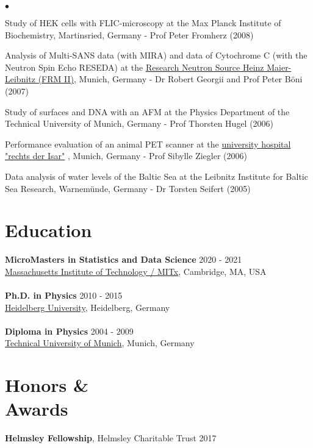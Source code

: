 \documentclass[margin,line]{res}
\newenvironment{list2}{
  \begin{list}{$\bullet$}{%
      \setlength{\itemsep}{0in}
      \setlength{\parsep}{0in} \setlength{\parskip}{0in}
      \setlength{\topsep}{0in} \setlength{\partopsep}{0in} 
      \setlength{\leftmargin}{0.2in}}}{\end{list}}
\begin{document}
\begin{resume}
\begin{list2}
\item Study of HEK cells with FLIC-microscopy at the Max Planck Institute of Biochemistry, Martinsried, Germany - Prof Peter Fromherz (2008)
\item Analysis of Multi-SANS data (with MIRA) and data of Cytochrome C (with the Neutron Spin Echo RESEDA) at the  \href{https://www.frm2.tum.de/en/home/}{Research Neutron Source Heinz Maier-Leibnitz (FRM II)}, Munich, Germany - Dr Robert Georgii and Prof Peter Böni (2007)
\item Study of surfaces and DNA with an AFM at the Physics Department of the Technical University of Munich, Germany - Prof Thorsten Hugel (2006)
\item Performance evaluation of an animal PET scanner at the  \href{https://www.mri.tum.de/}{university hospital "rechts der Isar"} , Munich, Germany - Prof Sibylle Ziegler (2006)
\item Data analysis of water levels of the Baltic Sea at the Leibnitz Institute for Baltic Sea Research, Warnemünde, Germany - Dr Torsten Seifert (2005)
\end{list2}


\section{\sc Education}
{\bf MicroMasters in Statistics and Data Science} \hfill {2020 - 2021}\\
\href{https://micromasters.mit.edu/ds/}{Massachusetts Institute of Technology / MITx}, Cambridge, MA, USA\\
\vspace*{-3mm}\\
{\bf Ph.D. in Physics} \hfill {2010 - 2015}\\
\href{https://www.uni-heidelberg.de/en}{Heidelberg University}, Heidelberg, Germany\\
\vspace*{-3mm}\\
{\bf Diploma in Physics} \hfill {2004 - 2009}\\
\href{https://www.tum.de/en/}{Technical University of Munich}, Munich, Germany


\section{\sc Honors \& \\Awards} 
{\bf Helmsley Fellowship}, Helmsley Charitable Trust  \hfill 2017


\end{resume}
\end{document}
